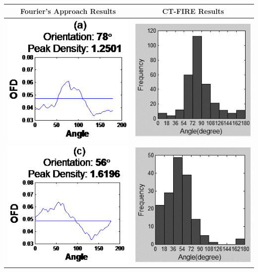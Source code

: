 \documentclass[12pt,a4paper]{article}
\begin{document}
\begin{table}[]
\begin{center}
\begin{tabular}{ |c|c| }
\hline
 \textbf{ Fourier's Approach Results} & \textbf{CT-FIRE Results} \\
\hline
\includegraphics[width=0.5\linewidth, trim=0 0 0 -10]{FiguresDisertation/t1a.png} &
\includegraphics[width=0.5\linewidth, trim=0 0 0 -10]{FiguresDisertation/t1b.png} \\
\hline
\includegraphics[width=0.5\linewidth, trim=0 0 0 -10]{FiguresDisertation/t1c.png} &
\includegraphics[width=0.5\linewidth, trim=0 0 0 -10]{FiguresDisertation/t1d.png} \\

\end{tabular}
\end{center}
\end{table}
\end{document}
